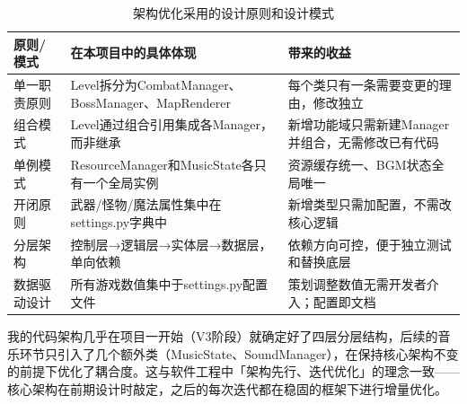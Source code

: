 \documentclass[12pt,a4paper]{ctexart}
\begin{document}
\begin{table}[H]
\centering
\small
\begin{tabularx}{\textwidth}{>{\raggedright\arraybackslash}p{2.8cm}>{\raggedright\arraybackslash}p{5.2cm}>{\raggedright\arraybackslash}p{5.2cm}}
\toprule
\textbf{原则/模式} & \textbf{在本项目中的具体体现} & \textbf{带来的收益} \\
\midrule
单一职责原则 & Level拆分为CombatManager、BossManager、MapRenderer & 每个类只有一条需要变更的理由，修改独立 \\[4pt]
组合模式 & Level通过组合引用集成各Manager，而非继承 & 新增功能域只需新建Manager并组合，无需修改已有代码 \\[4pt]
单例模式 & ResourceManager和MusicState各只有一个全局实例 & 资源缓存统一、BGM状态全局唯一 \\[4pt]
开闭原则 & 武器/怪物/魔法属性集中在settings.py字典中 & 新增类型只需加配置，不需改核心逻辑 \\[4pt]
分层架构 & 控制层→逻辑层→实体层→数据层，单向依赖 & 依赖方向可控，便于独立测试和替换底层 \\[4pt]
数据驱动设计 & 所有游戏数值集中于settings.py配置文件 & 策划调整数值无需开发者介入；配置即文档 \\
\bottomrule
\end{tabularx}
\caption{架构优化采用的设计原则和设计模式}
\end{table}

我的代码架构几乎在项目一开始（V3阶段）就确定好了四层分层结构，后续的音乐环节只引入了几个额外类（MusicState、SoundManager），在保持核心架构不变的前提下优化了耦合度。这与软件工程中「架构先行、迭代优化」的理念一致——核心架构在前期设计时敲定，之后的每次迭代都在稳固的框架下进行增量优化。
\end{document}
